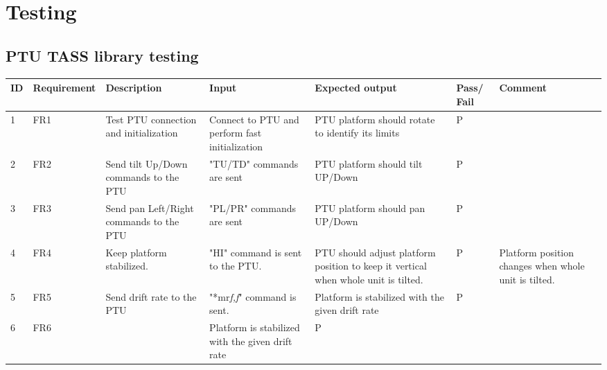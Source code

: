 \chapter{Testing}

\section{PTU TASS library testing}
\begin{landscape}
\begin{center}
\begin{table}[h]
\begin{tabular}{|p{0.3cm}|p{2cm}|p{4cm}|p{4cm}|p{5.4cm}|p{0.9cm}|p{4cm}|}
\hline
ID &  Requirement & Description &  Input &  Expected output & Pass/ Fail & Comment  \\ \hline
1 & FR1 & Test PTU connection and initialization & Connect to PTU and perform fast initialization &  PTU platform should rotate to identify its limits  & P &  \\ \hline
2 &  FR2 & Send tilt Up/Down commands to the PTU&  "TU/TD" commands are sent  &  PTU platform should tilt UP/Down  & P &  \\ \hline
3 & FR3 & Send pan Left/Right commands to the PTU & "PL/PR" commands are sent & PTU platform should pan UP/Down  & P & \\ \hline
4 & FR4 &  Keep platform stabilized. & "HI" command is sent to the PTU. & PTU should adjust platform position to keep it vertical when whole unit is tilted.  & P & Platform position changes when whole unit is tilted. \\ \hline
5 & FR5 & Send drift rate to the PTU & "*mr\textit{f,f}" command is sent. & Platform is stabilized with the given drift rate  & P &  \\ \hline
6 & FR6 &  & Platform is stabilized with the given drift rate  & P &  \\ \hline

\end{tabular}
\end{table}
\end{center}
\end{landscape}